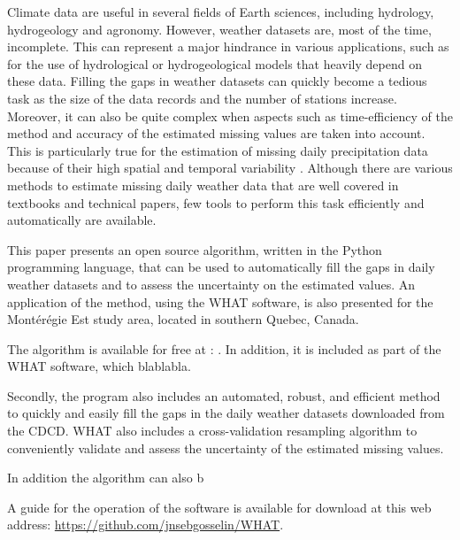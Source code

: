 \documentclass[TechnicalNoteMeteo.tex]{subfiles}
\begin{document}
Climate data are useful in several fields of Earth sciences, including hydrology, hydrogeology and agronomy. However, weather datasets are, most of the time, incomplete. This can represent a major hindrance in various applications, such as for the use of hydrological or hydrogeological models that heavily depend on these data. Filling the gaps in weather datasets can quickly become a tedious task as the size of the data records and the number of stations increase. Moreover, it can also be quite complex when aspects such as time-efficiency of the method and accuracy of the estimated missing values are taken into account. This is particularly true for the estimation of missing daily precipitation data because of their high spatial and temporal variability \citep{simolo_improving_2010}. Although there are various methods to estimate missing daily weather data that are well covered in textbooks and technical papers, few tools to perform this task efficiently and automatically are available.

This paper presents an open source algorithm, written in the Python programming language, that can be used to automatically fill the gaps in daily weather datasets and to assess the uncertainty on the estimated values. An application of the method, using the WHAT software, is also presented for the Mont\'er\'egie Est study area, located in southern Quebec, Canada. 

The algorithm is available for free at : . In addition, it is included as part of the WHAT software, which blablabla.

Secondly, the program also includes an automated, robust, and efficient method to quickly and easily fill the gaps in the daily weather datasets downloaded from the CDCD. WHAT also includes a cross-validation resampling algorithm to conveniently validate and assess the uncertainty of the estimated missing values.

In addition the algorithm can also b


A guide for the operation of the software \cite{gosselin_what_2015} is available for download at this web address: \url{https://github.com/jnsebgosselin/WHAT}.
\end{document}
